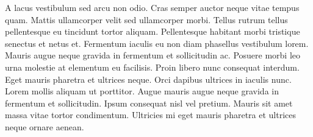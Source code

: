 A lacus vestibulum sed arcu non odio. Cras semper auctor neque vitae tempus quam. Mattis ullamcorper velit sed ullamcorper morbi. Tellus rutrum tellus pellentesque eu tincidunt tortor aliquam. Pellentesque habitant morbi tristique senectus et netus et. Fermentum iaculis eu non diam phasellus vestibulum lorem. Mauris augue neque gravida in fermentum et sollicitudin ac. Posuere morbi leo urna molestie at elementum eu facilisis. Proin libero nunc consequat interdum. Eget mauris pharetra et ultrices neque. Orci dapibus ultrices in iaculis nunc. Lorem mollis aliquam ut porttitor. Augue mauris augue neque gravida in fermentum et sollicitudin. Ipsum consequat nisl vel pretium. Mauris sit amet massa vitae tortor condimentum. Ultricies mi eget mauris pharetra et ultrices neque ornare aenean.